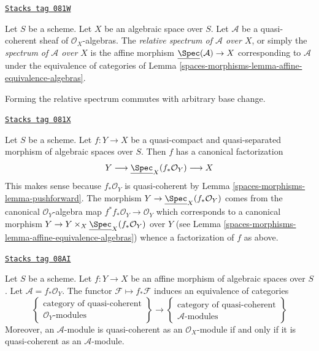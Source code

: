 \begin{definition}
\label{spaces-morphisms-definition-relative-spec}
\href{https://stacks.math.columbia.edu/tag/081W}{\texttt{Stacks tag 081W}}

Let $S$ be a scheme. Let $X$ be an algebraic space over $S$.
Let $\mathcal{A}$ be a quasi-coherent sheaf of
$\mathcal{O}_X$-algebras. The {\it relative spectrum of $\mathcal{A}$ over
$X$}, or simply the {\it spectrum of $\mathcal{A}$ over $X$} is the
affine morphism $\underline{\Spec}(\mathcal{A}) \to X$
corresponding to $\mathcal{A}$ under the equivalence of categories of
Lemma \ref{spaces-morphisms-lemma-affine-equivalence-algebras}.
\end{definition}

Forming the relative spectrum commutes with arbitrary base change.

\begin{remark}
\label{spaces-morphisms-remark-factorization-quasi-compact-quasi-separated}
\href{https://stacks.math.columbia.edu/tag/081X}{\texttt{Stacks tag 081X}}

Let $S$ be a scheme. Let $f : Y \to X$ be a quasi-compact and
quasi-separated morphism of algebraic spaces over $S$. Then
$f$ has a canonical factorization
$$
Y \longrightarrow \underline{\Spec}_X(f_*\mathcal{O}_Y) \longrightarrow X
$$
This makes sense because $f_*\mathcal{O}_Y$ is quasi-coherent
by Lemma \ref{spaces-morphisms-lemma-pushforward}. The morphism
$Y \to \underline{\Spec}_X(f_*\mathcal{O}_Y)$ comes from
the canonical $\mathcal{O}_Y$-algebra map
$f^*f_*\mathcal{O}_Y \to \mathcal{O}_Y$ which corresponds to
a canonical morphism
$Y \to Y \times_X \underline{\Spec}_X(f_*\mathcal{O}_Y)$ over $Y$ (see
Lemma \ref{spaces-morphisms-lemma-affine-equivalence-algebras}) whence a factorization
of $f$ as above.
\end{remark}

\begin{lemma}
\label{spaces-morphisms-lemma-affine-equivalence-modules}
\href{https://stacks.math.columbia.edu/tag/08AI}{\texttt{Stacks tag 08AI}}

Let $S$ be a scheme.
Let $f : Y \to X$ be an affine morphism of algebraic spaces over $S$.
Let $\mathcal{A} = f_*\mathcal{O}_Y$.
The functor $\mathcal{F} \mapsto f_*\mathcal{F}$ induces
an equivalence of categories
$$
\left\{
\begin{matrix}
\text{category of quasi-coherent}\\
\mathcal{O}_Y\text{-modules}
\end{matrix}
\right\}
\longrightarrow
\left\{
\begin{matrix}
\text{category of quasi-coherent}\\
\mathcal{A}\text{-modules}
\end{matrix}
\right\}
$$
Moreover, an $\mathcal{A}$-module is
quasi-coherent as an $\mathcal{O}_X$-module if and only if
it is quasi-coherent as an $\mathcal{A}$-module.
\end{lemma}

